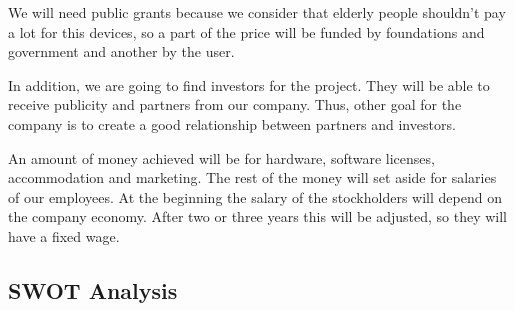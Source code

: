 We will need public grants because we consider that elderly people shouldn't pay a lot for this devices, so a part of the price will be funded by foundations and government and another by the user.

In addition, we are going to find investors for the project. They will be able to receive publicity and partners from our company. Thus, other goal for the company is to create a good relationship between partners and investors.

An amount of money achieved will be for hardware, software licenses, accommodation and marketing. The rest of the money will set aside for salaries of our employees. At the beginning the salary of the stockholders will depend on the company economy. After two or three years this will be adjusted, so they will have a fixed wage.


\subsection{SWOT Analysis}
